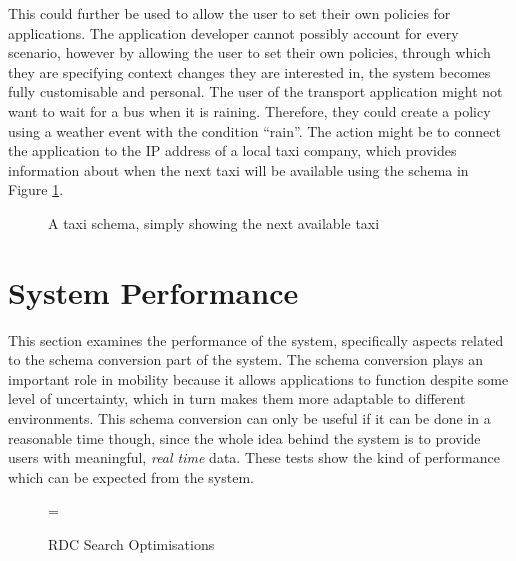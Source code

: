 \documentclass[12pt,twoside,notitlepage]{report}
\begin{document}
This could further be used to allow the user to set their own policies for applications. 
The application developer cannot possibly account for every scenario, however by allowing the user to set their own policies, through which they are specifying context changes they are interested in, the system becomes fully customisable and personal. 
The user of the transport application might not want to wait for a bus when it is raining. 
Therefore, they could create a policy using a weather event with the condition ``rain''. 
The action might be to connect the application to the IP address of a local taxi company, which provides information about when the next taxi will be available using the schema in Figure \ref{fig:taxi-schema-eval}.

\begin{figure}[h]

\caption[Example Schema for a Taxi]{A taxi schema, simply showing the next available taxi}
\label{fig:taxi-schema-eval}
\end{figure}





\section{System Performance}

This section examines the performance of the system, specifically aspects related to the schema conversion part of the system. 
The schema conversion plays an important role in mobility because it allows applications to function despite some level of uncertainty, which in turn makes them more adaptable to different environments. 
This schema conversion can only be useful if it can be done in a reasonable time though, since the whole idea behind the system is to provide users with meaningful, {\sl real time} data. 
These tests show the kind of performance which can be expected from the system. 

\begin{figure}[t]
\epsfxsize=\hsize
\centerline{}
\caption{RDC Search Optimisations}
\label{fig:rdc_search_optimisations}
\end{figure}
\end{document}
